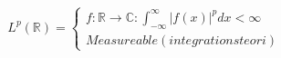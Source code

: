 \begin{align*}
L^p(\mathbb{R}) =
\left\{\begin{matrix}
f : \mathbb{R} \to \mathbb{C}: \int_{-\infty}^\infty |f(x)|^p dx < \infty \\
Measureable (integrationsteori)
\end{matrix}\right.
\end{align*}


%
%
%
%
